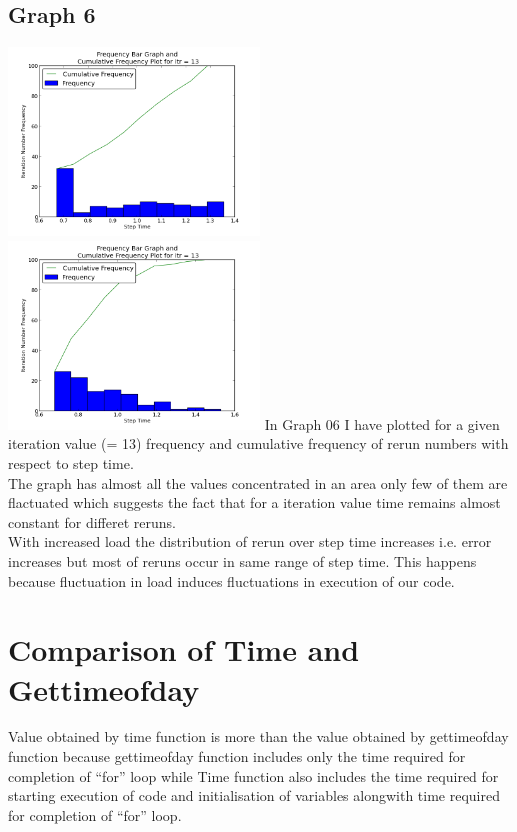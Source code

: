 \documentclass[11pt]{article}
\begin{document}
\subsection{Graph 6}
 \includegraphics[width=0.5\textwidth,keepaspectratio]{img/g08_plot05_low} \includegraphics[width=0.5\textwidth,keepaspectratio]{img/g08_plot05_high}
In Graph 06 I have plotted for a given iteration value (= 13) frequency and cumulative frequency of rerun numbers with respect to step time.\\
The graph has almost all the values concentrated in an area only few of them are flactuated which suggests the fact that for a iteration value time remains almost constant for differet reruns.\\
With increased load the distribution of rerun over step time increases i.e. error increases but most of reruns occur in same range of step time. This happens because fluctuation in load induces fluctuations in execution of our code.\\

\section{Comparison of Time and Gettimeofday}
Value obtained by time function is more than the value obtained by gettimeofday function because gettimeofday function includes only the time required for completion of ``for'' loop while Time function also includes the time required for starting execution of code and initialisation of variables alongwith
time required for completion of ``for'' loop.
\end{document}
